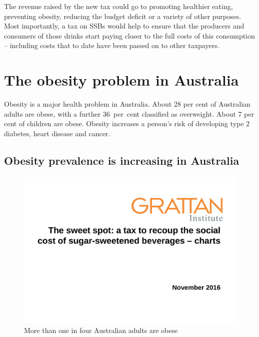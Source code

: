 \documentclass[embargoed]{grattan}
\begin{document}
\begin{overview}
The revenue raised by the new tax could go to promoting healthier eating, preventing obesity, reducing the budget deficit or a variety of other purposes.
Most importantly, a tax on SSBs would help to ensure that the producers and consumers of those drinks start paying closer to the full costs of this consumption – including costs that to date have been passed on to other taxpayers.



\end{overview}

\contentspage

\listoffigures
\listoftables

\chapter{The obesity problem in Australia}\label{the-obesity-problem-in-australia}

Obesity is a major health problem in Australia.
About 28 per cent of Australian adults are obese, with a further 36~per~cent classified as overweight.
About 7 per cent of children are obese.
Obesity increases a person's risk of developing type 2 diabetes, heart disease and cancer.

\section{Obesity prevalence is increasing in Australia }\label{obesity-prevalence-is-increasing-in-australia}

\begin{figure}
\caption{More than one in four Australian adults are obese}\label{fig:more-than-one-in-four-Australian-adults-are-obese}

\includegraphics[page=2]{atlas/ObesityCharts}


\end{figure}
\end{document}
